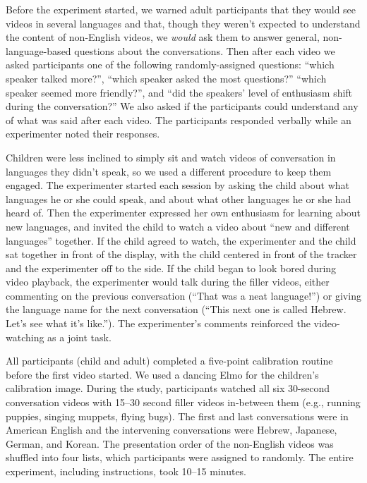 \documentclass[authoryear, 12pt]{elsarticle}
\begin{document}
Before the experiment started, we warned adult participants that they would see videos in several languages and that, though they weren't expected to understand the content of non-English videos, we \textit{would} ask them to answer general, non-language-based questions about the conversations. Then after each video we asked participants one of the following randomly-assigned questions: ``which speaker talked more?'', ``which speaker asked the most questions?'' ``which speaker seemed more friendly?'', and ``did the speakers' level of enthusiasm shift during the conversation?'' We also asked if the participants could understand any of what was said after each video. The participants responded verbally while an experimenter noted their responses.

Children were less inclined to simply sit and watch videos of conversation in languages they didn't speak, so we used a different procedure to keep them engaged. The experimenter started each session by asking the child about what languages he or she could speak, and about what other languages he or she had heard of. Then the experimenter expressed her own enthusiasm for learning about new languages, and invited the child to watch a video about ``new and different languages'' together. If the child agreed to watch, the experimenter and the child sat together in front of the display, with the child centered in front of the tracker and the experimenter off to the side. If the child began to look bored during video playback, the experimenter would talk during the filler videos, either commenting on the previous conversation (``That was a neat language!'') or giving the language name for the next conversation (``This next one is called Hebrew. Let's see what it's like.''). The experimenter's comments reinforced the video-watching as a joint task.

All participants (child and adult) completed a five-point calibration routine before the first video started. We used a dancing Elmo for the children's calibration image. During the study, participants watched all six 30-second conversation videos with 15--30 second filler videos in-between them (e.g., running puppies, singing muppets, flying bugs). The first and last conversations were in American English and the intervening conversations were Hebrew, Japanese, German, and Korean. The presentation order of the non-English videos was shuffled into four lists, which participants were assigned to randomly. The entire experiment, including instructions, took 10--15 minutes.
\end{document}
